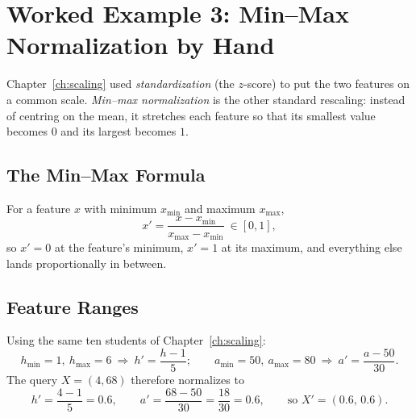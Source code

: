 \documentclass[11pt,a4paper]{report}
\theoremstyle{definition}
\theoremstyle{remark}
\begin{document}
	\chapter{Worked Example 3: Min--Max Normalization by Hand}
	\label{ch:minmax}
	
	Chapter~\ref{ch:scaling} used \emph{standardization} (the $z$-score) to put the
	two features on a common scale. \emph{Min--max normalization} is the other
	standard rescaling: instead of centring on the mean, it stretches each feature
	so that its smallest value becomes $0$ and its largest becomes $1$.
	
	\section{The Min--Max Formula}
	For a feature $x$ with minimum $x_{\min}$ and maximum $x_{\max}$,
	\begin{equation}
		x'=\frac{x-x_{\min}}{x_{\max}-x_{\min}}\ \in[0,1],
		\label{eq:minmax}
	\end{equation}
	so $x'=0$ at the feature's minimum, $x'=1$ at its maximum, and everything else
	lands proportionally in between.
	
	\section{Feature Ranges}
	Using the same ten students of Chapter~\ref{ch:scaling}:
	\[
	h_{\min}=1,\ h_{\max}=6\ \Rightarrow\ h'=\frac{h-1}{5};\qquad
	a_{\min}=50,\ a_{\max}=80\ \Rightarrow\ a'=\frac{a-50}{30}.
	\]
	The query $X=(4,68)$ therefore normalizes to
	\[
	h'=\frac{4-1}{5}=0.6,\qquad a'=\frac{68-50}{30}=\frac{18}{30}=0.6,
	\qquad\text{so } X'=(0.6,\,0.6).
	\]
	
\end{document}
